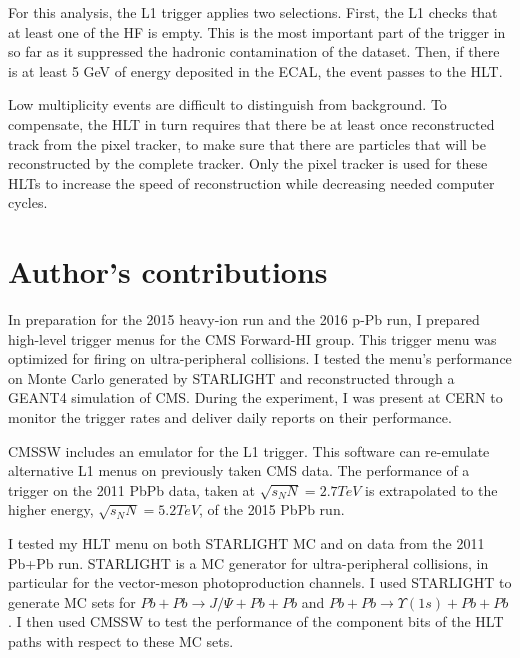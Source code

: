 For this analysis, the L1 trigger applies two selections. First, the L1 checks that at least one of the HF is empty. This is the most important part of the trigger in so far as it suppressed the hadronic contamination of the dataset. Then, if there is at least 5 GeV of energy deposited in the ECAL, the event passes to the HLT. 

Low multiplicity events are difficult to distinguish from background. To compensate, the HLT in turn requires that there be at least once reconstructed track from the pixel tracker, to make sure that there are particles that will be reconstructed by the complete tracker. Only the pixel tracker is used for these HLTs to increase the speed of reconstruction while decreasing needed computer cycles. 

\section{Author's contributions}

In preparation for the 2015 heavy-ion run and the 2016 p-Pb run, I prepared high-level trigger menus for the CMS Forward-HI group. This trigger menu was optimized for firing on ultra-peripheral collisions. I tested the menu's performance on Monte Carlo generated by STARLIGHT and reconstructed through a GEANT4 simulation of CMS. During the experiment, I was present at CERN to monitor the trigger rates and deliver daily reports on their performance. 

CMSSW includes an emulator for the L1 trigger. This software can re-emulate alternative L1 menus on previously taken CMS data. The performance of a trigger on the 2011 PbPb data, taken at $\sqrt{s_NN} = 2.7 TeV$ is extrapolated to the higher energy, $\sqrt{s_NN} = 5.2 TeV$, of the 2015 PbPb run.

I tested my HLT menu on both STARLIGHT MC and on data from the 2011 Pb+Pb run. STARLIGHT is a MC generator for ultra-peripheral collisions, in particular for the vector-meson photoproduction channels. I used STARLIGHT to generate MC sets for $Pb+Pb\rightarrow J/\Psi+Pb+Pb$ and $Pb+Pb\rightarrow \Upsilon(1s)+Pb+Pb$. I then used CMSSW to test the performance of the component bits of the HLT paths with respect to these MC sets. 

